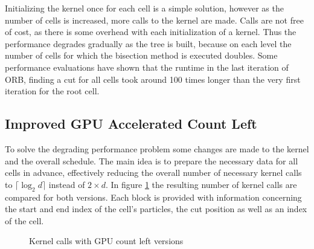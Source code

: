 \documentclass[]{article}
\begin{document}
Initializing the kernel once for each cell is a simple solution, however as the number of cells is increased, more calls to the kernel are made. Calls are not free of cost, as there is some overhead with each initialization of a kernel. Thus the performance degrades gradually as the tree is built, because on each level the number of cells for which the bisection method is executed doubles. Some performance evaluations have shown that the runtime in the last iteration of ORB, finding a cut for all cells took around 100 times longer than the very first iteration for the root cell. 

\subsection{Improved GPU Accelerated Count Left} \label{imprctl}

To solve the degrading performance problem some changes are made to the kernel and the overall schedule. The main idea is to prepare the necessary data for all cells in advance, effectively reducing the overall number of necessary kernel calls to $\lceil \log_2 d \rceil $ instead of $2 \times d$. In figure \ref{fig:degrading} the resulting number of kernel calls are compared for both versions. Each block is provided with information concerning the start and end index of the cell's particles, the cut position as well as an index of the cell. 


\begin{figure}[H]
	\begin{center}
		\caption{Kernel calls with GPU count left versions}
		\label{fig:degrading}
	\end{center}
\end{figure}
\end{document}
